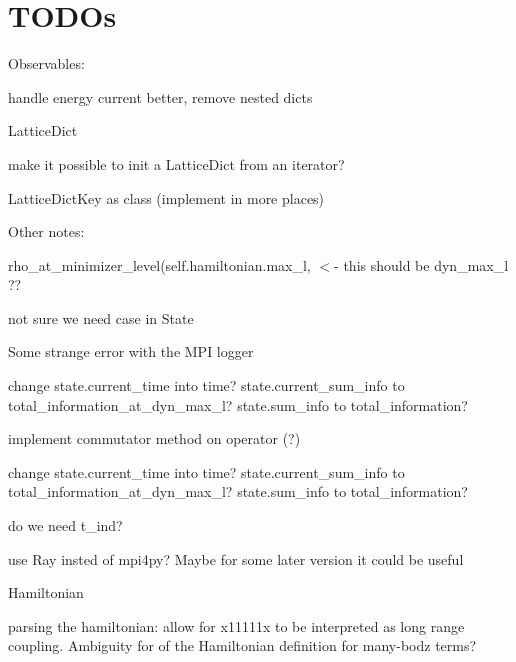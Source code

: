 \chapter{TODOs}
\hypertarget{md__2_users_2christoph_2local-information_2local__information_2docs_2todo}{}\label{md__2_users_2christoph_2local-information_2local__information_2docs_2todo}
\label{md__2_users_2christoph_2local-information_2local__information_2docs_2todo_autotoc_md73}%
%

\begin{DoxyItemize}
\item Observables\+:
\begin{DoxyItemize}
\item handle energy current better, remove nested dicts
\end{DoxyItemize}
\item Lattice\+Dict
\begin{DoxyItemize}
\item make it possible to init a Lattice\+Dict from an iterator?
\item Lattice\+Dict\+Key as class (implement in more places)
\end{DoxyItemize}
\item Other notes\+:
\begin{DoxyItemize}
\item rho\+\_\+at\+\_\+minimizer\+\_\+level(self.\+hamiltonian.\+max\+\_\+l, \texorpdfstring{$<$}{<}-\/ this should be dyn\+\_\+max\+\_\+l ??
\item not sure we need {\ttfamily case} in {\ttfamily State}
\item Some strange error with the MPI logger
\item change state.\+current\+\_\+time into time? state.\+current\+\_\+sum\+\_\+info to total\+\_\+information\+\_\+at\+\_\+dyn\+\_\+max\+\_\+l? state.\+sum\+\_\+info to total\+\_\+information?
\item implement commutator method on operator (?)
\item change state.\+current\+\_\+time into time? state.\+current\+\_\+sum\+\_\+info to total\+\_\+information\+\_\+at\+\_\+dyn\+\_\+max\+\_\+l? state.\+sum\+\_\+info to total\+\_\+information?
\item do we need t\+\_\+ind?
\item use Ray insted of mpi4py? Maybe for some later version it could be useful
\end{DoxyItemize}
\item Hamiltonian
\begin{DoxyItemize}
\item parsing the hamiltonian\+: allow for x11111x to be interpreted as long range coupling. Ambiguity for of the Hamiltonian definition for many-\/bodz terms? 
\end{DoxyItemize}
\end{DoxyItemize}